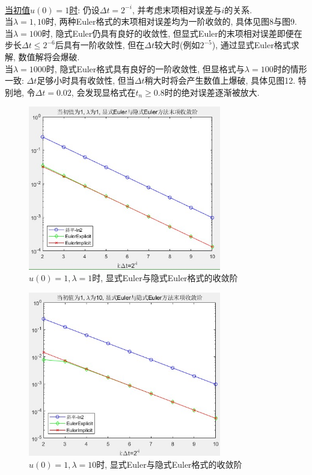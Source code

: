 \documentclass[12pt]{article}
\begin{document}
\quad\\

\noindent \underline{当初值$u(0)=1$时}: 仍设$\Delta{t}=2^{-i}$, 并考虑末项相对误差与$i$的关系.\\
当$\lambda=1,10$时, 两种Euler格式的末项相对误差均为一阶收敛的, 具体见图8与图9.\\
当$\lambda=100$时, 隐式Euler仍具有良好的收敛性, 但显式Euler的末项相对误差即便在步长$\Delta{t} \le2^{-6}$后具有一阶收敛性, 但在$\Delta{t}$较大时(例如$2^{-5}$), 通过显式Euler格式求解, 数值解将会爆破.\\
当$\lambda=1000$时, 隐式Euler格式具有良好的一阶收敛性, 但显格式与$\lambda=100$时的情形一致: $\Delta{t}$足够小时具有收敛性, 但当$\Delta{t}$稍大时将会产生数值上爆破, 具体见图12. 特别地, 令$\Delta{t}=0.02$, 会发现显格式在$t_n\ge0.8$时的绝对误差逐渐被放大.
\begin{figure}[H]
	\centering
	\includegraphics[width=0.75\textwidth]{8}
	\caption{$u(0)=1, \lambda=1$时, 显式Euler与隐式Euler格式的收敛阶}
\end{figure}
\begin{figure}[H]
	\centering
	\includegraphics[width=0.75\textwidth]{9}
	\caption{$u(0)=1, \lambda=10$时, 显式Euler与隐式Euler格式的收敛阶}
\end{figure}
\end{document}

